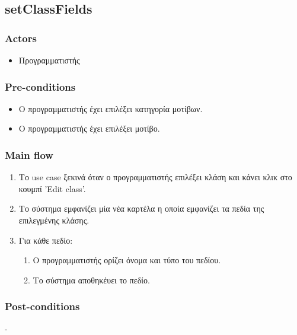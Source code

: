 \documentclass[../diploma_thesis.tex]{subfiles}
\begin{document}
\subsection{setClassFields}
\subsubsection{Actors}
\begin{itemize}
\item  Προγραμματιστής
\end{itemize}
\subsubsection{Pre-conditions}
\begin{itemize}
\item Ο προγραμματιστής έχει επιλέξει κατηγορία μοτίβων.
\item  Ο προγραμματιστής έχει επιλέξει μοτίβο.
\end{itemize}
\subsubsection{Main flow}
\begin{enumerate}
\item Το use case ξεκινά όταν ο προγραμματιστής επιλέξει κλάση και κάνει κλικ στο κουμπί 'Edit class'.
\item Το σύστημα εμφανίζει μία νέα καρτέλα η οποία εμφανίζει τα πεδία της επιλεγμένης κλάσης.
\item Για κάθε πεδίο:\begin{enumerate}
\item Ο προγραμματιστής ορίζει όνομα και τύπο του πεδίου.
\item Το σύστημα αποθηκέυει το πεδίο.
\end{enumerate}
\end{enumerate}
\subsubsection{Post-conditions}
-
\end{document}
